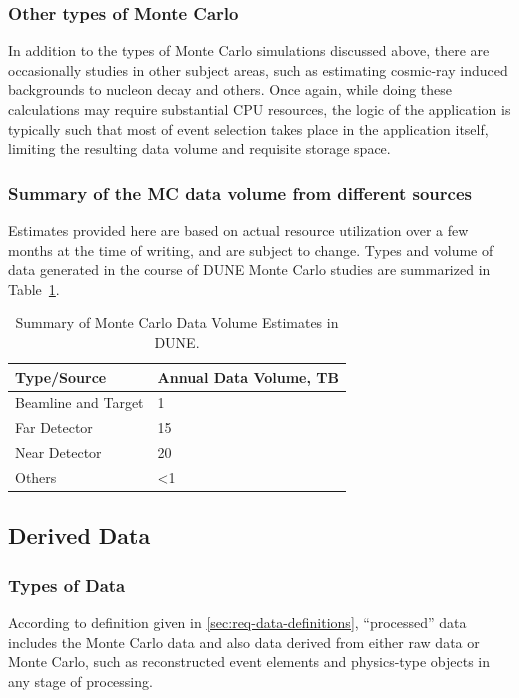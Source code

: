 \subsubsection{Other types of Monte Carlo}
In addition to the types of Monte Carlo simulations discussed above, there are occasionally studies in other subject areas,
such as estimating cosmic-ray induced backgrounds to nucleon decay and others. Once again, while doing these calculations
may require substantial CPU resources, the logic of the application is typically such that most of event selection takes place
in the application itself, limiting the resulting data volume and requisite storage space. 

\subsubsection{Summary of the MC data volume from different sources}
Estimates provided here are based on actual resource utilization over a few months at the time of writing, and are subject
to change. Types and volume of data generated in the course of DUNE Monte Carlo studies are summarized in Table~\ref{tab:mc-data}.
\begin{table}[ht!]
\centering
\begin{tabular}{| p{1.8in} | p{2.1in} |}		\hline		
\textbf{Type/Source} & \textbf{Annual Data Volume, TB}\\ \hline
Beamline and Target & 1 \\ \hline
Far Detector & 15 \\ \hline
Near Detector & 20 \\ \hline
Others & <1 \\ \hline
\end{tabular}
\caption{Summary of Monte Carlo Data Volume Estimates in DUNE.}
\label{tab:mc-data}
\end{table}

\subsection{Derived Data}
\label{sec:derived-data}
\subsubsection{Types of Data}
According to definition given in \ref{sec:req-data-definitions}, ``processed'' data includes the Monte Carlo data and
also data derived from either raw data or Monte Carlo, such as reconstructed event elements and physics-type objects
in any stage of processing.

